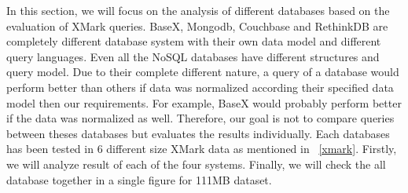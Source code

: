 In this section, we will focus on the analysis of different databases based on the  evaluation of XMark queries. BaseX, Mongodb, Couchbase and RethinkDB are  completely different database system  with their own data model and different query languages. Even all the NoSQL databases have different structures and query model.  Due to their complete different nature, a query of a database would perform better than others if data was normalized according their specified data model then our requirements. For example, BaseX would probably perform better if the data was normalized as well. Therefore, our goal is not to compare queries between theses databases but evaluates the results individually.  Each databases has been tested in 6 different size XMark data as mentioned in ~\ref{xmark}. Firstly, we will analyze result of each of the four systems. Finally, we will check the all database together in a single figure for 111MB dataset. 

